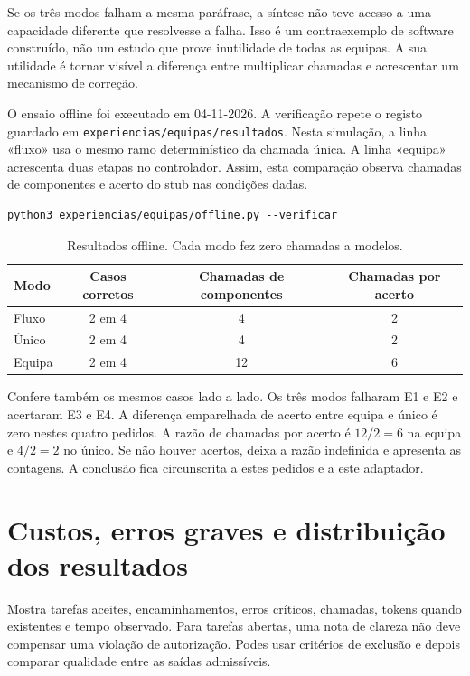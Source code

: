 Se os três modos falham a mesma paráfrase, a síntese não teve acesso a uma capacidade diferente que resolvesse a falha. Isso é um contraexemplo de software construído, não um estudo que prove inutilidade de todas as equipas. A sua utilidade é tornar visível a diferença entre multiplicar chamadas e acrescentar um mecanismo de correção.

O ensaio offline foi executado em 04-11-2026. A verificação repete o registo guardado em \nolinkurl{experiencias/equipas/resultados}. Nesta simulação, a linha «fluxo» usa o mesmo ramo determinístico da chamada única. A linha «equipa» acrescenta duas etapas no controlador. Assim, esta comparação observa chamadas de componentes e acerto do stub nas condições dadas.

\begin{lstlisting}
python3 experiencias/equipas/offline.py --verificar
\end{lstlisting}

\begin{table}[htbp]
\small
\centering
\begin{tabular}{@{}lccc@{}}
\toprule
Modo & Casos corretos & Chamadas de componentes & Chamadas por acerto \\
\midrule
Fluxo & 2 em 4 & 4 & 2 \\
Único & 2 em 4 & 4 & 2 \\
Equipa & 2 em 4 & 12 & 6 \\
\bottomrule
\end{tabular}
\caption{Resultados offline. Cada modo fez zero chamadas a modelos.}
\label{tab:comparacao-offline}
\end{table}

Confere também os mesmos casos lado a lado. Os três modos falharam E1 e E2 e acertaram E3 e E4. A diferença emparelhada de acerto entre equipa e único é zero nestes quatro pedidos. A razão de chamadas por acerto é $12/2=6$ na equipa e $4/2=2$ no único. Se não houver acertos, deixa a razão indefinida e apresenta as contagens. A conclusão fica circunscrita a estes pedidos e a este adaptador.

\section{Custos, erros graves e distribuição dos resultados}
Mostra tarefas aceites, encaminhamentos, erros críticos, chamadas, tokens quando existentes e tempo observado. Para tarefas abertas, uma nota de clareza não deve compensar uma violação de autorização. Podes usar critérios de exclusão e depois comparar qualidade entre as saídas admissíveis.

